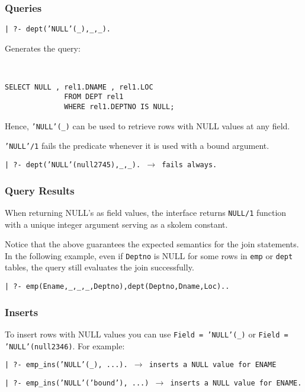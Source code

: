 \subsubsection{Queries}

\begin{center}

{\tt | ?- dept('NULL'(\_),\_,\_).}
\end{center}

Generates the query: 


\begin{verbatim}


SELECT NULL , rel1.DNAME , rel1.LOC
			  FROM DEPT rel1
			  WHERE rel1.DEPTNO IS NULL;
\end{verbatim}

Hence, {\tt 'NULL'(\_)} can be used to retrieve rows with NULL values 
at any field.

{\tt 'NULL'/1} fails the predicate whenever it is
used with a bound argument.
\begin{center}

{\tt | ?- dept('NULL'(null2745),\_,\_). $\rightarrow$ fails always.}
\end{center}


\subsubsection{Query Results}
When returning NULL's as field values, the interface returns {\tt NULL/1} 
function with a unique integer argument serving as a skolem constant.

Notice that the above guarantees the expected semantics for the join 
statements.  In the following example, even if {\tt Deptno} is NULL for some rows in {\tt emp} or {\tt dept} tables, the query still evaluates the join successfully.
\begin{center}

{\tt | ?- emp(Ename,\_,\_,\_,Deptno),dept(Deptno,Dname,Loc)..}
\end{center}

\subsubsection{Inserts}

To insert rows with NULL values you can use {\tt Field = 'NULL'(\_)} or
{\tt Field = 'NULL'(null2346)}.  For example:

\begin{center}

{\tt | ?- emp\_ins('NULL'(\_), ...).  $\rightarrow$ inserts a NULL value for ENAME}
\end{center}
\begin{center}

{\tt | ?- emp\_ins('NULL'('bound'), ...) $\rightarrow$ inserts a NULL value for ENAME.}

\end{center}


